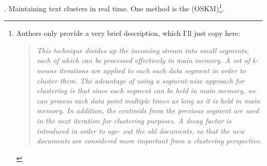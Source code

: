 \documentclass[11pt]{article}
\begin{document}
\p {}. Maintaining text clusters in real time. One method is the  (OSKM)\footnote{Authors only provide a very brief description, which I'll just copy here:
\vspace{-1em}
\begin{quote}
	{\tiny \textit{This technique
			divides up the incoming stream into small segments, each of which can
			be processed effectively in main memory. A set of k-means iterations
			are applied to each such data segment in order to cluster them. The
			advantage of using a segment-wise approach for clustering is that since
			each segment can be held in main memory, we can process each data
			point multiple times as long as it is held in main memory. In addition,
			the centroids from the previous segment are used in the next iteration
			for clustering purposes. A decay factor is introduced in order to age-
			out the old documents, so that the new documents are considered more
			important from a clustering perspective.} }
\end{quote}}.
\end{document}
